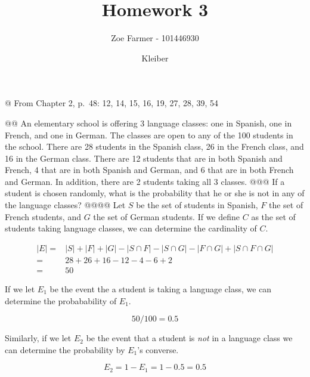 \documentclass[10pt]{article}
\title{Homework 3}
\date{Kleiber}
\author{Zoe Farmer - 101446930}
\begin{document}
\maketitle

\begin{table}[!ht]
    \centering
\end{table}

\begin{easylist}[enumerate]
    @ From Chapter 2, p.\ 48: 12, 14, 15, 16, 19, 27, 28, 39, 54

    @@ An elementary school is offering 3 language classes: one in Spanish, one in French, and one in German. The classes are open to any of the 100 students in the school. There are 28 students in the Spanish class, 26 in the French class, and 16 in the German class. There are 12 students that are in both Spanish and French, 4 that are in both Spanish and German, and 6 that are in both French and German. In addition, there are 2 students taking all 3 classes.
    @@@ If a student is chosen randomly, what is the probability that he or she is not in any of the language classes?
    @@@@ Let $S$ be the set of students in Spanish, $F$ the set of French students, and $G$ the set of German students. If we define $C$ as the set of students taking language classes, we can determine the cardinality of $C$.

        \[ \begin{aligned}
        |E| =& |S| + |F| + |G| - |S \cap F| - |S \cap G| - |F \cap G| + |S \cap F \cap G|\\
            =& 28 + 26 + 16 - 12 - 4 - 6 + 2\\
            =& 50
        \end{aligned} \]

        If we let $E_1$ be the event the a student is taking a language class, we can determine the probabability of $E_1$.

        \[ 50/100 = 0.5 \]

        Similarly, if we let $E_2$ be the event that a student is \textit{not} in a language class we can determine the probability by $E_1$'s converse.

        \[ E_2 = 1 - E_1 = 1 - 0.5 = \boxed{0.5} \]


\end{easylist}
\end{document}
